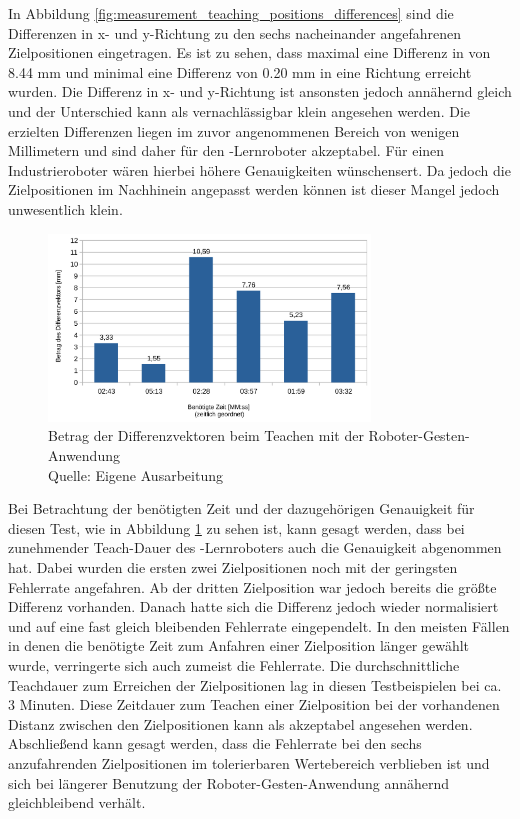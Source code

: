 In Abbildung \ref {fig:measurement_teaching_positions_differences} sind die Differenzen in x- und y-Richtung zu den sechs nacheinander angefahrenen Zielpositionen eingetragen. Es ist zu sehen, dass maximal eine Differenz in von \num{8,44} mm und minimal eine Differenz von \num{0,20} mm in eine Richtung erreicht wurden. Die Differenz in x- und y-Richtung ist ansonsten jedoch annähernd gleich und der Unterschied kann als vernachlässigbar klein angesehen werden. Die erzielten Differenzen liegen im zuvor angenommenen Bereich von wenigen Millimetern und sind daher für den -Lernroboter akzeptabel. Für einen Industrieroboter wären hierbei höhere Genauigkeiten wünschensert. Da jedoch die Zielpositionen im Nachhinein angepasst werden können ist dieser Mangel jedoch unwesentlich klein.

\begin{figure}[htb]
	\centering
	\includegraphics[width=0.761\textwidth]{images/ergebnisse/Betrag_der_Differenzvektoren}
	\caption[Betrag der Differenzvektoren beim Teachen mit der Roboter-Gesten-Anwendung]{Betrag der Differenzvektoren beim Teachen mit der Roboter-Gesten-Anwendung\\Quelle: Eigene Ausarbeitung}
	\label{fig:measurement_teaching_positions_time_and_errors}
\end{figure}
\FloatBarrier

Bei Betrachtung der benötigten Zeit und der dazugehörigen Genauigkeit für diesen Test, wie in Abbildung \ref{fig:measurement_teaching_positions_time_and_errors} zu sehen ist, kann gesagt werden, dass bei zunehmender Teach-Dauer des -Lernroboters auch die Genauigkeit abgenommen hat. Dabei wurden die ersten zwei Zielpositionen noch mit der geringsten Fehlerrate angefahren. Ab der dritten Zielposition war jedoch bereits die größte Differenz vorhanden. Danach hatte sich die Differenz jedoch wieder normalisiert und auf eine fast gleich bleibenden Fehlerrate eingependelt. In den meisten Fällen in denen die benötigte Zeit zum Anfahren einer Zielposition länger gewählt wurde, verringerte sich auch zumeist die Fehlerrate. Die durchschnittliche Teachdauer zum Erreichen der Zielpositionen lag in diesen Testbeispielen bei ca. 3 Minuten. Diese Zeitdauer zum Teachen einer Zielposition bei der vorhandenen Distanz zwischen den Zielpositionen kann als akzeptabel angesehen werden. Abschließend kann gesagt werden, dass die Fehlerrate bei den sechs anzufahrenden Zielpositionen im tolerierbaren Wertebereich verblieben ist und sich bei längerer Benutzung der Roboter-Gesten-Anwendung annähernd gleichbleibend verhält.

